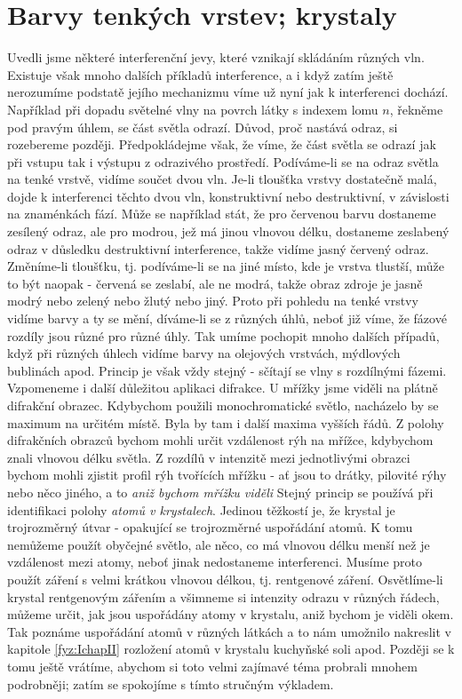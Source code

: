   \section{Barvy tenkých vrstev; krystaly}\label{fyz:IchapXXXsecV}
    Uvedli jsme některé interferenční jevy, které vznikají skládáním různých vln. Existuje však 
    mnoho dalších příkladů interference, a i když zatím ještě nerozumíme podstatě jejího mechanizmu 
    víme už nyní jak k interferenci dochází. Například při dopadu světelné vlny na povrch látky s 
    indexem lomu \(n\), řekněme pod pravým úhlem, se část světla odrazí. Důvod, proč nastává odraz, 
    si rozebereme později. Předpokládejme však, že víme, že část světla se odrazí jak při vstupu 
    tak i výstupu z odrazivého prostředí. Podíváme-li se na odraz světla na tenké vrstvě, vidíme 
    součet dvou vln. Je-li tloušťka vrstvy dostatečně malá, dojde k interferenci těchto dvou vln, 
    konstruktivní nebo destruktivní, v závislosti na znaménkách fází. Může se například stát, že 
    pro červenou barvu dostaneme zesílený odraz, ale pro modrou, jež má jinou vlnovou délku, 
    dostaneme zeslabený odraz v důsledku destruktivní interference, takže vidíme jasný červený 
    odraz. Změníme-li tloušťku, tj. podíváme-li se na jiné místo, kde je vrstva tlustší, může to 
    být naopak - červená se zeslabí, ale ne modrá, takže obraz zdroje je jasně modrý nebo     
    zelený nebo žlutý nebo jiný. Proto při pohledu na tenké vrstvy vidíme barvy a ty se mění, 
    díváme-li se z různých úhlů, neboť již víme, že fázové rozdíly jsou různé pro různé úhly. Tak 
    umíme pochopit mnoho dalších případů, když při různých úhlech vidíme barvy na olejových 
    vrstvách, mýdlových bublinách apod. Princip je však vždy stejný - sčítají se vlny s rozdílnými 
    fázemi. Vzpomeneme i další důležitou aplikaci difrakce. U mřížky jsme viděli na plátně 
    difrakční obrazec. Kdybychom použili monochromatické světlo, nacházelo by se maximum na určitém 
    místě. Byla by tam i další maxima vyšších řádů. Z polohy difrakčních obrazců bychom mohli určit 
    vzdálenost rýh na mřížce, kdybychom znali vlnovou délku světla. Z rozdílů v intenzitě mezi 
    jednotlivými obrazci bychom mohli zjistit profil rýh tvořících mřížku - ať jsou to drátky, 
    pilovité rýhy nebo něco jiného, a to \emph{aniž bychom mřížku viděli} Stejný princip se používá 
    při identifikaci polohy \emph{atomů v krystalech}. Jedinou těžkostí je, že krystal je 
    trojrozměrný útvar - opakující se trojrozměrné uspořádání atomů. K tomu nemůžeme použít 
    obyčejné světlo, ale něco, co má vlnovou délku menší než je vzdálenost mezi atomy, neboť jinak 
    nedostaneme interferenci. Musíme proto použít záření s velmi krátkou vlnovou délkou, tj. 
    rentgenové záření. Osvětlíme-li krystal rentgenovým zářením a všimneme si intenzity odrazu v 
    různých řádech, můžeme určit, jak jsou uspořádány atomy v krystalu, aniž bychom je viděli okem. 
    Tak poznáme uspořádání atomů v různých látkách a to nám umožnilo nakreslit v kapitole 
    \ref{fyz:IchapII} rozložení atomů v krystalu kuchyňské soli apod. Později se k tomu ještě 
    vrátíme, abychom si toto velmi zajímavé téma probrali mnohem podrobněji; zatím se spokojíme s 
    tímto stručným výkladem.
  
